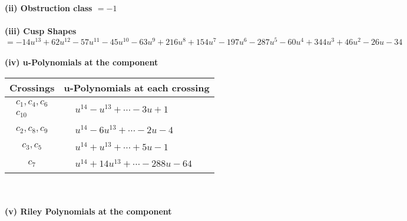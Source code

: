 \documentclass[1p]{elsarticle_modified}
\theoremstyle{definition}
\begin{document}
\flushleft \textbf{(ii) Obstruction class $= -1$}\\~\\
\flushleft \textbf{(iii) Cusp Shapes $= -14 u^{13}+62 u^{12}-57 u^{11}-45 u^{10}-63 u^9+216 u^8+154 u^7-197 u^6-287 u^5-60 u^4+344 u^3+46 u^2-26 u-34$}\\~\\
\newpage\renewcommand{\arraystretch}{1}
\flushleft \textbf{(iv) u-Polynomials at the component}\newline \\
\begin{tabular}{m{50pt}|m{274pt}}
Crossings & \hspace{64pt}u-Polynomials at each crossing \\
\hline $$\begin{aligned}c_{1},c_{4},c_{6}\\c_{10}\end{aligned}$$&$\begin{aligned}
&u^{14}- u^{13}+\cdots-3 u+1
\end{aligned}$\\
\hline $$\begin{aligned}c_{2},c_{8},c_{9}\end{aligned}$$&$\begin{aligned}
&u^{14}-6 u^{13}+\cdots-2 u-4
\end{aligned}$\\
\hline $$\begin{aligned}c_{3},c_{5}\end{aligned}$$&$\begin{aligned}
&u^{14}+u^{13}+\cdots+5 u-1
\end{aligned}$\\
\hline $$\begin{aligned}c_{7}\end{aligned}$$&$\begin{aligned}
&u^{14}+14 u^{13}+\cdots-288 u-64
\end{aligned}$\\
\hline
\end{tabular}\\~\\
\newpage\renewcommand{\arraystretch}{1}
\flushleft \textbf{(v) Riley Polynomials at the component}\newline \\
\end{document}
